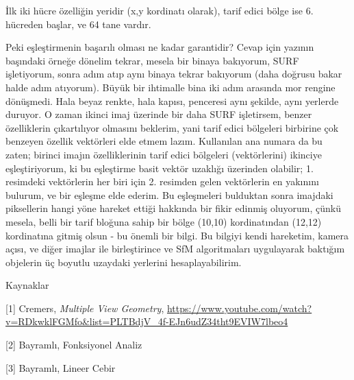 \documentclass[12pt,fleqn]{article}\usepackage{../../common}
\begin{document}
İlk iki hücre özelliğin yeridir (x,y kordinatı olarak), tarif edici bölge
ise 6. hücreden başlar, ve 64 tane vardır.

Peki eşleştirmenin başarılı olması ne kadar garantidir? Cevap için yazının
başındaki örneğe dönelim tekrar, mesela bir binaya bakıyorum, SURF
işletiyorum, sonra adım atıp aynı binaya tekrar bakıyorum (daha doğrusu
bakar halde adım atıyorum). Büyük bir ihtimalle bina iki adım arasında mor
rengine dönüşmedi. Hala beyaz renkte, hala kapısı, penceresi aynı şekilde,
aynı yerlerde duruyor. O zaman ikinci imaj üzerinde bir daha SURF
işletirsem, benzer özelliklerin çıkartılıyor olmasını beklerim, yani tarif
edici bölgeleri birbirine çok benzeyen özellik vektörleri elde etmem
lazım. Kullanılan ana numara da bu zaten; birinci imajın özelliklerinin
tarif edici bölgeleri (vektörlerini) ikinciye eşleştiriyorum, ki bu
eşleştirme basit vektör uzaklığı üzerinden olabilir; 1. resimdeki
vektörlerin her biri için 2. resimden gelen vektörlerin en yakınını
bulurum, ve bir eşleşme elde ederim. Bu eşleşmeleri bulduktan sonra
imajdaki piksellerin hangi yöne hareket ettiği hakkında bir fikir edinmiş
oluyorum, çünkü mesela, belli bir tarif bloğuna sahip bir bölge (10,10)
kordinatından (12,12) kordinatına gitmiş olsun - bu önemli bir bilgi. Bu
bilgiyi kendi hareketim, kamera açısı, ve diğer imajlar ile birleştirince
ve SfM algoritmaları uygulayarak baktığım objelerin üç boyutlu uzaydaki
yerlerini hesaplayabilirim.

Kaynaklar

[1] Cremers, {\em Multiple View Geometry}, \url{https://www.youtube.com/watch?v=RDkwklFGMfo&list=PLTBdjV_4f-EJn6udZ34tht9EVIW7lbeo4}

[2] Bayramlı, Fonksiyonel Analiz

[3] Bayramlı, Lineer Cebir
\end{document}
